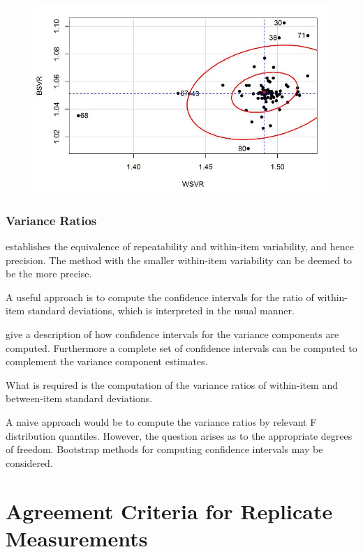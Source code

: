 \documentclass[12pt, a4paper]{report}
\theoremstyle{definition}
\theoremstyle{remark}
\begin{document}
	\begin{figure}[h!]
		\centering
		\includegraphics[width=0.9\linewidth]{08-plot1}
		\caption{}
		\label{fig:08-plot1}
	\end{figure}
	


\subsubsection{Variance Ratios}
\citet{ARoy2009} establishes the equivalence of repeatability and within-item variability, and hence precision.  The method with the smaller within-item variability can be deemed to be the more precise.
	
A useful approach is to compute the confidence intervals for the ratio of within-item standard deviations, which is interpreted in the usual manner.
	
\citet[pg 93-95]{PB} give a description of how confidence intervals for the variance components are computed. Furthermore a complete set of confidence intervals can be computed to complement the variance component estimates.
	
What is required is the computation of the variance ratios of within-item and between-item standard deviations.
	
A naive approach would be to compute the variance ratios by relevant F distribution quantiles. However, the question arises as to the appropriate degrees of freedom.
	Bootstrap methods for computing confidence intervals may be considered.
	





\section{Agreement Criteria for Replicate Measurements}	
\end{document}
